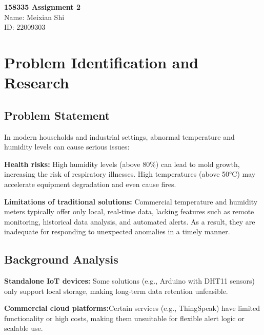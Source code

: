 \documentclass[12pt,a4paper]{article}
\begin{document}
\begin{titlepage}
    \centering
    \Large\textbf{158335 Assignment 2}\\[1cm]
    \normalsize
    Name: Meixian Shi\\[1cm]
    ID: 22009303\\[1cm]
\end{titlepage}

\tableofcontents

\newpage

\section{Problem Identification and Research}

\subsection{Problem Statement}
In modern households and industrial settings, abnormal temperature and humidity levels can cause serious issues:

\vspace{\baselineskip}
\noindent
\textbf{Health risks:} High humidity levels (above 80\%) can lead to mold growth, increasing the risk of respiratory illnesses. High temperatures (above 50°C) may accelerate equipment degradation and even cause fires.

\vspace{\baselineskip}
\noindent
\textbf{Limitations of traditional solutions:} Commercial temperature and humidity meters typically offer only local, real-time data, lacking features such as remote monitoring, historical data analysis, and automated alerts. As a result, they are inadequate for responding to unexpected anomalies in a timely manner.

\subsection{Background Analysis}

\noindent
\textbf{Standalone IoT devices:} Some solutions (e.g., Arduino with DHT11 sensors) only support local storage, making long-term data retention unfeasible.

\vspace{\baselineskip}
\noindent
\textbf{Commercial cloud platforms:}Certain services (e.g., ThingSpeak) have limited functionality or high costs, making them unsuitable for flexible alert logic or scalable use.
\end{document}
